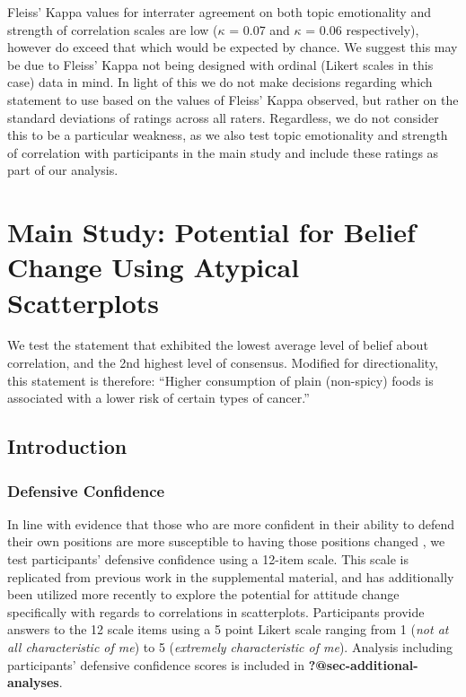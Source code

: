 \documentclass[manuscript,screen,review]{acmart}
\begin{document}
Fleiss' Kappa values for interrater agreement on both topic emotionality
and strength of correlation scales are low (\(\kappa\) = 0.07 and
\(\kappa\) = 0.06 respectively), however do exceed that which would be
expected by chance. We suggest this may be due to Fleiss' Kappa not
being designed with ordinal (Likert scales in this case) data in mind.
In light of this we do not make decisions regarding which statement to
use based on the values of Fleiss' Kappa observed, but rather on the
standard deviations of ratings across all raters. Regardless, we do not
consider this to be a particular weakness, as we also test topic
emotionality and strength of correlation with participants in the main
study and include these ratings as part of our analysis.

\section{Main Study: Potential for Belief Change Using Atypical
Scatterplots}\label{sec-main-study}

We test the statement that exhibited the lowest average level of belief
about correlation, and the 2nd highest level of consensus. Modified for
directionality, this statement is therefore: ``Higher consumption of
plain (non-spicy) foods is associated with a lower risk of certain types
of cancer.''

\subsection{Introduction}\label{introduction}

\subsubsection{Defensive Confidence}\label{defensive-confidence}

In line with evidence that those who are more confident in their ability
to defend their own positions are more susceptible to having those
positions changed \citep{albarracin_2004}, we test participants'
defensive confidence using a 12-item scale. This scale is replicated
from previous work in the supplemental material, and has additionally
been utilized more recently \citep{markant_2023} to explore the
potential for attitude change specifically with regards to correlations
in scatterplots. Participants provide answers to the 12 scale items
using a 5 point Likert scale ranging from 1 (\emph{not at all
characteristic of me}) to 5 (\emph{extremely characteristic of me}).
Analysis including participants' defensive confidence scores is included
in \textbf{?@sec-additional-analyses}.
\end{document}
